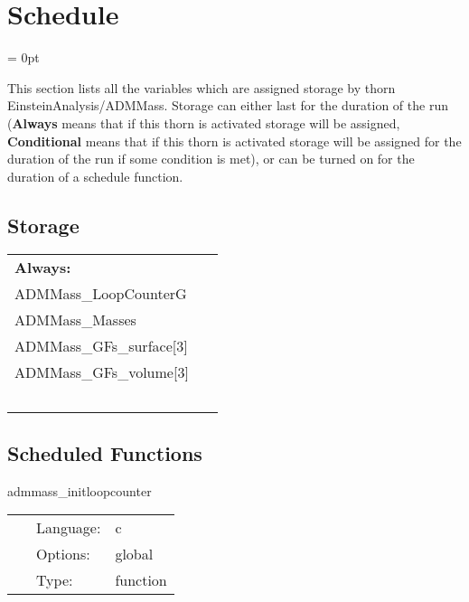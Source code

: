 
\section{Schedule} 


\parskip = 0pt


\noindent This section lists all the variables which are assigned storage by thorn EinsteinAnalysis/ADMMass.  Storage can either last for the duration of the run ({\bf Always} means that if this thorn is activated storage will be assigned, {\bf Conditional} means that if this thorn is activated storage will be assigned for the duration of the run if some condition is met), or can be turned on for the duration of a schedule function.


\subsection*{Storage}

\hspace{5mm}

 \begin{tabular*}{160mm}{ll} 

{\bf Always:}&  ~ \\ 
 ADMMass\_LoopCounterG & ~\\ 
 ADMMass\_Masses & ~\\ 
 ADMMass\_GFs\_surface[3] & ~\\ 
 ADMMass\_GFs\_volume[3] & ~\\ 
~ & ~\\ 
\end{tabular*} 


\subsection*{Scheduled Functions}
\vspace{5mm}


\hspace{5mm} admmass\_initloopcounter 

\hspace{5mm}{\it initialise the loop counter for admmass } 


\hspace{5mm}

 \begin{tabular*}{160mm}{cll} 
~ & Language:  & c \\ 
~ & Options:  & global \\ 
~ & Type:  & function \\ 
\end{tabular*} 


